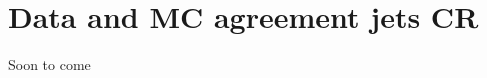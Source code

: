 \documentclass[12pt, a4paper]{book}
\begin{document}
\chapter{Data and MC agreement jets CR}\label{appendix:no_padding}
Soon to come


\clearpage
\end{document}
